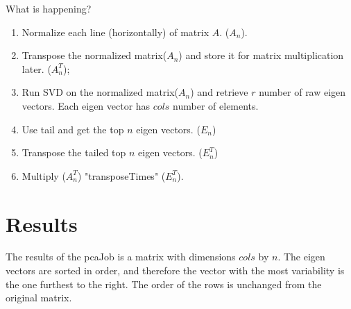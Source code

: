 \documentclass[a4paper]{article}
\begin{document}
\begin{enumerate}
\begin{itemize}
	\end{itemize}
	What is happening? 
	\begin{enumerate}
	\item Normalize each line (horizontally) of matrix $A$. ($A_n$).
	\item Transpose the normalized matrix($A_n$) and store it for matrix multiplication later. ($A_n^T$);
	\item Run SVD on the normalized matrix($A_n$) and retrieve $r$ number of raw eigen vectors. Each eigen 			vector has $cols$ number of elements.
	\item Use tail and get the top $n$ eigen vectors. ($E_{n}$)
	\item Transpose the tailed top $n$ eigen vectors. ($E_{n}^T$)
	\item Multiply ($A_n^T$) "transposeTimes" ($E_{n}^T$).
	\end{enumerate}
\end{enumerate}

\section{Results}
The results of the pcaJob is a matrix with dimensions $cols$ by $n$. The eigen vectors are sorted in order, and therefore the vector with the most variability is the one furthest to the right. The order of the rows is unchanged from the original matrix.
\end{document}
